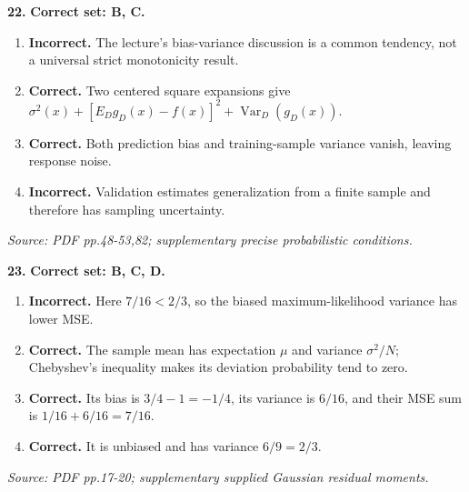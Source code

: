 \documentclass[11pt,a4paper]{article}
\begin{document}
\par\noindent\begin{minipage}{\linewidth}
\textbf{22.} \textbf{Correct set: B, C.}
\begin{enumerate}[label=(\Alph*),leftmargin=8mm,itemsep=2pt,topsep=2pt]
\item \textbf{Incorrect.} The lecture's bias-variance discussion is a common tendency, not a universal strict monotonicity result.
\item \textbf{Correct.} Two centered square expansions give \(\sigma^2(x)+[E_Dg_D(x)-f(x)]^2+\operatorname{Var}_D(g_D(x))\).
\item \textbf{Correct.} Both prediction bias and training-sample variance vanish, leaving response noise.
\item \textbf{Incorrect.} Validation estimates generalization from a finite sample and therefore has sampling uncertainty.
\end{enumerate}
{\footnotesize\textit{Source: PDF pp.48-53,82; supplementary precise probabilistic conditions.}}

\end{minipage}\par\vspace{3mm}
\par\noindent\begin{minipage}{\linewidth}
\textbf{23.} \textbf{Correct set: B, C, D.}
\begin{enumerate}[label=(\Alph*),leftmargin=8mm,itemsep=2pt,topsep=2pt]
\item \textbf{Incorrect.} Here \(7/16<2/3\), so the biased maximum-likelihood variance has lower MSE.
\item \textbf{Correct.} The sample mean has expectation \(\mu\) and variance \(\sigma^2/N\); Chebyshev's inequality makes its deviation probability tend to zero.
\item \textbf{Correct.} Its bias is \(3/4-1=-1/4\), its variance is \(6/16\), and their MSE sum is \(1/16+6/16=7/16\).
\item \textbf{Correct.} It is unbiased and has variance \(6/9=2/3\).
\end{enumerate}
{\footnotesize\textit{Source: PDF pp.17-20; supplementary supplied Gaussian residual moments.}}

\end{minipage}\par\vspace{3mm}
\end{document}
